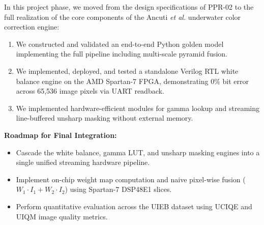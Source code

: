 \documentclass[10pt,twocolumn,letterpaper]{article}
\begin{document}
In this project phase, we moved from the design specifications of PPR-02 to the full realization of the core components of the Ancuti \emph{et al.} underwater color correction engine:
\begin{enumerate}
    \item We constructed and validated an end-to-end Python golden model implementing the full pipeline including multi-scale pyramid fusion.
    \item We implemented, deployed, and tested a standalone Verilog RTL white balance engine on the AMD Spartan-7 FPGA, demonstrating $0\%$ bit error across 65,536 image pixels via UART readback.
    \item We implemented hardware-efficient modules for gamma lookup and streaming line-buffered unsharp masking without external memory.
\end{enumerate}

\textbf{Roadmap for Final Integration:}
\begin{itemize}
    \item Cascade the white balance, gamma LUT, and unsharp masking engines into a single unified streaming hardware pipeline.
    \item Implement on-chip weight map computation and naive pixel-wise fusion ($W_1 \cdot I_1 + W_2 \cdot I_2$) using Spartan-7 DSP48E1 slices.
    \item Perform quantitative evaluation across the UIEB dataset using UCIQE and UIQM image quality metrics.
\end{itemize}

{\small


}
\end{document}
